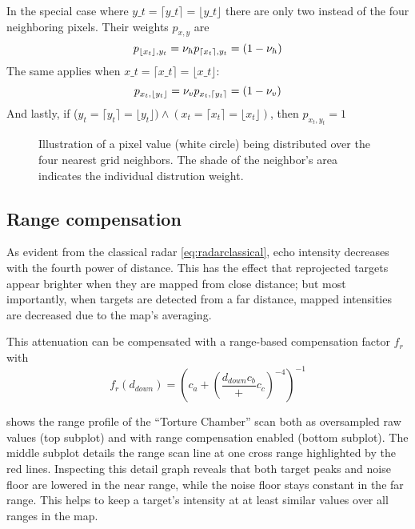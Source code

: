 In the special case where $y\_t = \lceil y\_t \rceil = \lfloor y\_t\rfloor$ there are only two instead of the four neighboring pixels. Their weights \(p_{x,y}\) are \[
p_{\lfloor x_t \rfloor, y_t} = \nu_h\\
p_{\lceil x_t \rceil, y_t} = (1 - \nu_h)
\] The same applies when $x\_t = \lceil x\_t \rceil = \lfloor x\_t\rfloor$: \[
p_{x_t, \lfloor y_t \rfloor} = \nu_v\\
p_{x_t, \lceil y_t \rceil} = (1 - \nu_v)
\] And lastly, if
(\(y_t = \lceil y_t \rceil = \lfloor y_t \rfloor ) \land (x_t = \lceil x_t \rceil = \lfloor x_t \rfloor )\),
then \(p_{x_t, y_t} = 1\)

\begin{figure}[htbp]
    \centering
    \def\svgwidth{10cm}
    
    \caption{Illustration of a pixel value (white circle) being distributed over the four nearest grid neighbors. The shade of the neighbor's area indicates the individual distrution weight.}
    \label{fig:Sample_splitting}
\end{figure}

\subsection{Range compensation}\label{range-compensation}

As evident from the classical radar \cref{eq:radarclassical}, echo intensity decreases with
the fourth power of distance. This has the effect that reprojected
targets appear brighter when they are mapped from close distance; but
most importantly, when targets are detected from a far distance, mapped
intensities are decreased due to the map's averaging.

This attenuation can be compensated with a range-based compensation
factor \(f_r\) with \[f_r(d_{down}) = {
\left(
c_a + (
\frac{{d_{down}}{c_b}}
+ c_c)^{-4}
\right) ^ {-1}
}\]



 shows the range profile of the ``Torture Chamber'' scan
both as oversampled raw values (top subplot) and with range compensation
enabled (bottom subplot). The middle subplot details the range scan line
at one cross range highlighted by the red lines. Inspecting this detail
graph reveals that both target peaks and noise floor are lowered in the
near range, while the noise floor stays constant in the far range. This
helps to keep a target's intensity at at least similar values over all
ranges in the map.

